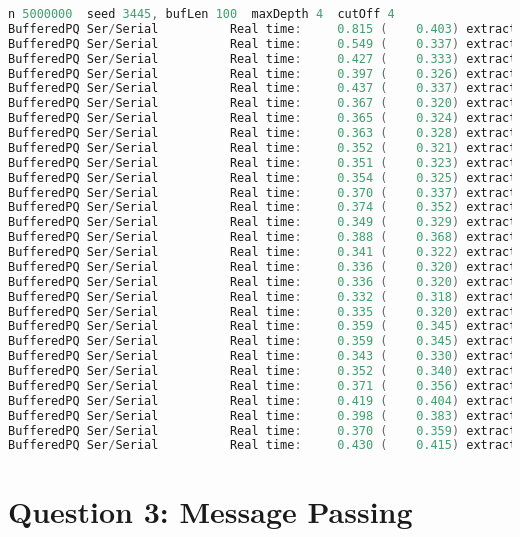 \documentclass[format=acmsmall, review=false, screen=true]{acmart}
\begin{document}
\begin{lstlisting}[language=java]
n 5000000  seed 3445, bufLen 100  maxDepth 4  cutOff 4
BufferedPQ Ser/Serial          Real time:     0.815 (    0.403) extract: 5000000
BufferedPQ Ser/Serial          Real time:     0.549 (    0.337) extract: 2500000
BufferedPQ Ser/Serial          Real time:     0.427 (    0.333) extract: 1666666
BufferedPQ Ser/Serial          Real time:     0.397 (    0.326) extract: 1250000
BufferedPQ Ser/Serial          Real time:     0.437 (    0.337) extract: 1000000
BufferedPQ Ser/Serial          Real time:     0.367 (    0.320) extract: 833333
BufferedPQ Ser/Serial          Real time:     0.365 (    0.324) extract: 714285
BufferedPQ Ser/Serial          Real time:     0.363 (    0.328) extract: 625000
BufferedPQ Ser/Serial          Real time:     0.352 (    0.321) extract: 555555
BufferedPQ Ser/Serial          Real time:     0.351 (    0.323) extract: 500000
BufferedPQ Ser/Serial          Real time:     0.354 (    0.325) extract: 454545
BufferedPQ Ser/Serial          Real time:     0.370 (    0.337) extract: 416666
BufferedPQ Ser/Serial          Real time:     0.374 (    0.352) extract: 384615
BufferedPQ Ser/Serial          Real time:     0.349 (    0.329) extract: 357142
BufferedPQ Ser/Serial          Real time:     0.388 (    0.368) extract: 333333
BufferedPQ Ser/Serial          Real time:     0.341 (    0.322) extract: 312500
BufferedPQ Ser/Serial          Real time:     0.336 (    0.320) extract: 294117
BufferedPQ Ser/Serial          Real time:     0.336 (    0.320) extract: 277777
BufferedPQ Ser/Serial          Real time:     0.332 (    0.318) extract: 263157
BufferedPQ Ser/Serial          Real time:     0.335 (    0.320) extract: 250000
BufferedPQ Ser/Serial          Real time:     0.359 (    0.345) extract: 238095
BufferedPQ Ser/Serial          Real time:     0.359 (    0.345) extract: 227272
BufferedPQ Ser/Serial          Real time:     0.343 (    0.330) extract: 217391
BufferedPQ Ser/Serial          Real time:     0.352 (    0.340) extract: 208333
BufferedPQ Ser/Serial          Real time:     0.371 (    0.356) extract: 200000
BufferedPQ Ser/Serial          Real time:     0.419 (    0.404) extract: 192307
BufferedPQ Ser/Serial          Real time:     0.398 (    0.383) extract: 185185
BufferedPQ Ser/Serial          Real time:     0.370 (    0.359) extract: 178571
BufferedPQ Ser/Serial          Real time:     0.430 (    0.415) extract: 172413
\end{lstlisting}

\section{Question 3: Message Passing}
\end{document}
